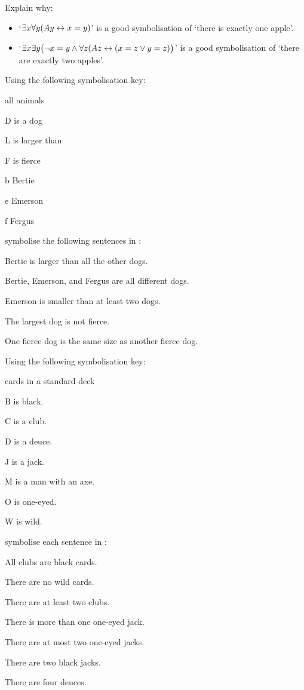 \problempart Explain why:
\begin{itemize}
\item   `$\exists x \forall y(Ay \leftrightarrow x= y)$' is a good symbolisation of `there is exactly one apple'.
\item `$\exists x \exists y \bigl(\neg x = y \wedge \forall z(Az \leftrightarrow (x= z \vee y = z) \bigr)$' is a good symbolisation of `there are exactly two apples'.
\end{itemize}

\problempart Using the following symbolisation key:
\begin{ekey}
\item[\domain] all animals
\item[D]  is a dog
\item[L]  is larger than 
\item[F]  is fierce
\item[b] Bertie
\item[e] Emerson
\item[f] Fergus
\end{ekey}
symbolise the following sentences in \FOL:
\begin{earg}
\item Bertie is larger than all the other dogs.
\item Bertie, Emerson, and Fergus are all different dogs.
\item Emerson is smaller than at least two dogs.
\item The largest dog is not fierce.
\item One fierce dog is the same size as another fierce dog.
\end{earg}

\problempart
\label{pr.FOLcardsa}
Using the following symbolisation key:
\begin{ekey}
\item[\domain] cards in a standard deck
\item[B]  is black.
\item[C]  is a club.
\item[D]  is a deuce.
\item[J]  is a jack.
\item[M]  is a man with an axe.
\item[O]  is one-eyed.
\item[W]  is wild.
\end{ekey}
symbolise each sentence in \FOL:
\begin{earg}
\item All clubs are black cards.
\item There are no wild cards.
\item There are at least two clubs.
\item There is more than one one-eyed jack.
\item There are at most two one-eyed jacks.
\item There are two black jacks.
\item There are four deuces.
\end{earg}

